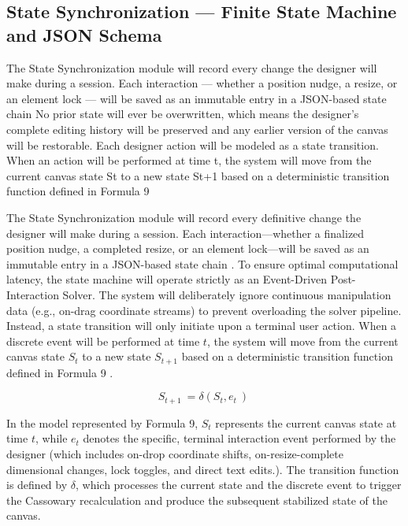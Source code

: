 \begin{refsection}
\subsection{State Synchronization — Finite State Machine and JSON Schema}
The State Synchronization module will record every change the designer will make during a session. Each interaction — whether a position nudge, a resize, or an element lock — will be saved as an immutable entry in a JSON-based state chain  No prior state will ever be overwritten, which means the designer's complete editing history will be preserved and any earlier version of the canvas will be restorable.
Each designer action will be modeled as a state transition. When an action will be performed at time t, the system will move from the current canvas state St to a new state St+1 based on a deterministic transition function defined in Formula 9 

The State Synchronization module will record every definitive change the designer will make during a session. Each interaction—whether a finalized position nudge, a completed resize, or an element lock—will be saved as an immutable entry in a JSON-based state chain \cite{Sabau2024RealTime}. To ensure optimal computational latency, the state machine will operate strictly as an Event-Driven Post-Interaction Solver. The system will deliberately ignore continuous manipulation data (e.g., on-drag coordinate streams) to prevent overloading the solver pipeline. Instead, a state transition will only initiate upon a terminal user action. When a discrete event will be performed at time $t$, the system will move from the current canvas state $S_t$ to a new state $S_{t+1}$ based on a deterministic transition function defined in Formula 9 \cite{Kleppmann2022CRDT}.

\begin{center}
\begin{minipage}{0.8\textwidth}
\begin{equation}
S_{t+1}\ =\delta(S_t,e_t\ )\ 
\end{equation}
\centering
\end{minipage}
\end{center}

In the model represented by Formula 9, $S_t$ represents the current canvas state at time $t$, while $e_t$ denotes the specific, terminal interaction event performed by the designer (which includes on-drop coordinate shifts, on-resize-complete dimensional changes, lock toggles, and direct text edits.). The transition function is defined by $\delta$, which processes the current state and the discrete event to trigger the Cassowary recalculation and produce the subsequent stabilized state of the canvas.


\end{refsection}
